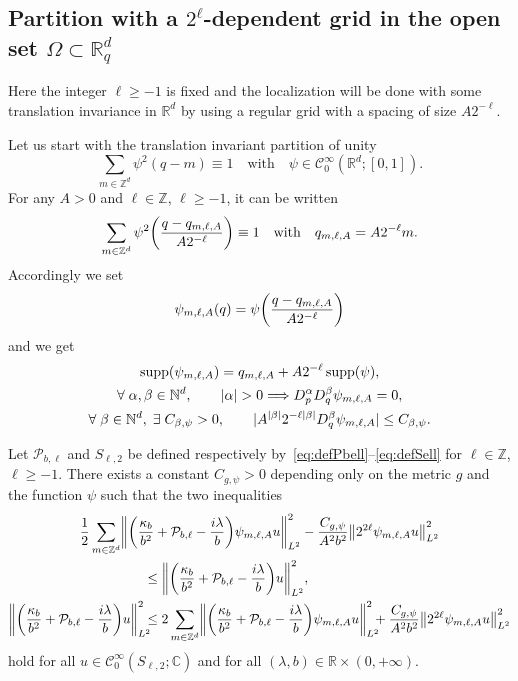 \documentclass[AHL,Unicode,longabstracts]{cedram}
\newcommand{\C}{\mathbb{C}}
\newcommand{\Z}{\mathbb{Z}}
\newcommand{\R}{\mathbb{R}}
\newcommand{\N}{\mathbb{N}}
\newcommand{\clC}{\mathcal{C}}
\newcommand{\clP}{\mathcal{P}}
\DeclareMathOperator{\suppp}{supp}
\newcommand\norm[1]{\left\lVert#1\right\rVert}
\let\oldexists\exists
\renewcommand*{\exists}{\mathrel{\oldexists}}
\let\oldforall\forall
\renewcommand*{\forall}{\mathrel{\oldforall}}
\let\originalleft\left
\let\originalright\right
\renewcommand{\left}{\mathopen{}\mathclose\bgroup\originalleft}
\renewcommand{\right}{\aftergroup\egroup\originalright}
\renewcommand*{\implies}{\mathchoice{\Longrightarrow}{\Rightarrow}{\Rightarrow}{\Rightarrow}}
\begin{document}
\subsection{Partition with a \texorpdfstring{$2^\ell$}{2\^l}-dependent grid in the open set \texorpdfstring{$\Omega\subset\R^d_q$}{Omegac R\^d\_q}}\label{sec:gridpart}
Here the integer $\ell\geq -1$ is fixed and the localization will be done with some translation invariance in $\R^d$ by using a regular grid with a spacing of size $A2^{-\ell}$.

Let us start with the translation invariant partition of unity
\begin{equation}\label{eq:DefinitionOfPsi}
\sum_{m\in\Z^d}\psi^2(q-m)\equiv 1\quad\text{with}\quad\psi\in \clC^{\infty}_0(\R^d;[0,1]).
\end{equation}
For any $A>0$ and $\ell\in\Z$, $\ell\geq -1$, it can be written
\[
\sum_{m\in\Z^d}\psi^2\left(\frac{q-q_{m,\ell,A}}{A2^{-\ell}}\right)\equiv 1\quad \text{with}\quad q_{m,\ell,A}=A2^{-\ell}m.
\]
Accordingly we set
\[
\psi_{m,\ell,A}(q)=\psi\left(\frac{q-q_{m,\ell,A}}{A2^{-\ell}}\right)
\]
and we get
\begin{gather}
 \suppp(\psi_{m,\ell,A}) = q_{m,\ell,A}+A2^{-\ell}\suppp(\psi), \\
\forall \alpha, \beta \in \N^{d}, \qquad |\alpha|>0 \implies D_{p}^{\alpha}D_{q}^{\beta}\psi_{m,\ell,A} = 0, \\
\forall \beta \in \N^{d}, \;\exists C_{\beta,\psi}>0, \qquad |A^{|\beta|}2^{-\ell|\beta|} D_{q}^{\beta}\psi_{m,\ell,A}| \leq C_{\beta,\psi}.\label{eq:derpsimellA}
\end{gather}

\pagebreak
\begin{prop}\label{pr:controlOfErrorAfterGridPartitionOfUnity}
Let $\clP_{b,\ell}$ and $S_{\ell,2}$ be defined respectively by~\eqref{eq:defPbell}--\eqref{eq:defSell} for $\ell\in\Z$, $\ell\geq -1$. There exists a constant $C_{g,\psi}>0$ depending only on the metric $g$ and the function $\psi$ such that the two inequalities
\begin{multline*}
\frac{1}{2}\sum_{m\in \Z^d}\left\| \left(\frac{\kappa_{b}}{b^{2}}+\clP_{b,\ell} - \frac{i\lambda}{b}\right) \psi_{m,\ell,A}u \right\|^{2}_{L^2}-\frac{C_{g,\psi}}{A^2b^2}\norm{2^{2\ell}\psi_{m,\ell,A}u}_{L^2}^2\\
\begin{aligned}
&\leq
\left\| \left(\frac{\kappa_{b}}{b^{2}}+\clP_{b,\ell} - \frac{i\lambda}{b}\right) u \right\|^{2}_{L^2},\quad
\\
\left\| \left(\frac{\kappa_{b}}{b^{2}}+\clP_{b,\ell} - \frac{i\lambda}{b}\right) u \right\|^{2}_{L^2}\mkern-10mu &\leq 2 \sum_{m\in\Z^d}\left\| \left(\frac{\kappa_{b}}{b^{2}}+\clP_{b,\ell}-\frac{i\lambda}{b}\right) \psi_{m,\ell,A} u \right\|^{2}_{L^2}\mkern-10mu+\frac{C_{g,\psi}}{A^2b^2}\norm{2^{2\ell}\psi_{m,\ell,A}u}_{L^2}^2
\end{aligned}
\end{multline*}
hold for all $u\in \clC^{\infty}_0(S_{\ell,2};\C)$ and for all $(\lambda,b)\in\R\times (0,+\infty)$.
\end{prop}
\end{document}
